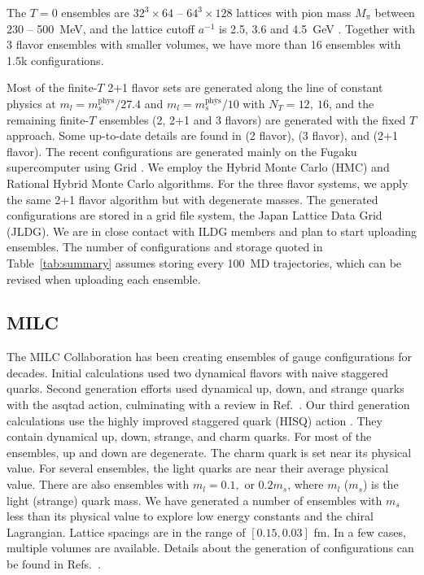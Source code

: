\documentclass[a4paper,11pt]{article}
\begin{document}
The $T=0$ ensembles are $32^3\times 64$ -- $64^3 \times 128$ lattices
with pion mass $M_\pi$ between 230 -- 500~MeV, and the lattice cutoff
$a^{-1}$ is 2.5, 3.6 and 4.5~GeV \cite{Colquhoun:2022atw}.  Together
with 3 flavor ensembles with smaller volumes, we have more than 16
ensembles with 1.5k configurations.

Most of the finite-$T$ 2+1 flavor sets are generated along the line of
constant physics at $m_l=m_s^{\text{phys}}/27.4$ and
$m_l=m_s^{\text{phys}}/10$ with $N_T=12,~16$, and the remaining
finite-$T$ ensembles (2, 2+1 and 3 flavors) are generated with the
fixed $T$ approach.  Some up-to-date details are found in
\cite{Aoki:2021qws} (2 flavor), \cite{Zhang:2024ldl} (3 flavor), and
\cite{JLQCD:2024xey} (2+1 flavor).  The recent configurations are
generated mainly on the Fugaku supercomputer using Grid
\cite{Boyle:2016lbp}.  We employ the Hybrid Monte Carlo (HMC) and
Rational Hybrid Monte Carlo algorithms.  For the three flavor systems,
we apply the same 2+1 flavor algorithm but with degenerate masses.
The generated configurations are stored in a grid file system, the
Japan Lattice Data Grid (JLDG). We are in close contact with ILDG
members and plan to start uploading ensembles.  The number of
configurations and storage quoted in Table~\ref{tab:summary} assumes
storing every 100~MD trajectories, which can be revised when uploading
each ensemble.

\subsection{MILC}
The MILC Collaboration has been creating ensembles of gauge
configurations for decades.  Initial calculations used two dynamical
flavors with naive staggered quarks.  Second generation efforts used
dynamical up, down, and strange quarks with the asqtad action,
culminating with a review in Ref.~\cite{MILC:2009mpl}.  Our third
generation calculations use the highly improved staggered quark (HISQ)
action \cite{Follana:2006rc}.  They contain dynamical up, down,
strange, and charm quarks.  For most of the ensembles, up and down are
degenerate.  The charm quark is set near its physical value.  For
several ensembles, the light quarks are near their average physical
value.  There are also ensembles with $m_l= 0.1,$ or $0.2 m_s$, where
$m_l$ ($m_s$) is the light (strange) quark mass.  We have generated a
number of ensembles with $m_s$ less than its physical value to explore
low energy constants and the chiral Lagrangian.  Lattice spacings are
in the range of $[0.15, 0.03]$ fm.  In a few cases, multiple volumes
are available.  Details about the generation of configurations can be
found in Refs.~\cite{MILC:2010pul,MILC:2012znn,Bazavov:2017lyh}.
\end{document}
